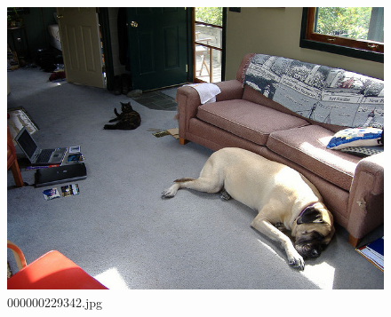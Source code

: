 \begin{figure}[h]
    \centering
    \includegraphics[width=0.8\linewidth]{../image set/hard/000000229342.jpg}
    \caption{000000229342.jpg}
\end{figure}
